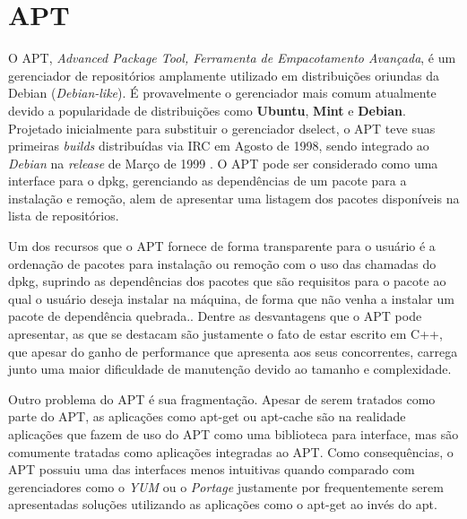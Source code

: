 \section{APT} %
\label{sec:apt}



O {\code APT}, \textit{Advanced Package Tool, Ferramenta de Empacotamento Avançada}, é um gerenciador de repositórios  amplamente utilizado em distribuições oriundas da Debian (\textit{Debian-like}).
É provavelmente o gerenciador mais comum atualmente devido a popularidade de distribuições como \textbf{Ubuntu}, \textbf{Mint} e \textbf{Debian}.
Projetado inicialmente para substituir o gerenciador {\code dselect}, o APT teve suas primeiras \textit{builds} distribuídas via IRC em Agosto de 1998,  sendo integrado ao \textit{Debian} na \textit{release} de Março de 1999 \cite{garbee2008brief}. O  APT pode ser considerado como uma interface para o {\code dpkg}, gerenciando as dependências de um pacote para a instalação e remoção, alem de apresentar uma listagem dos pacotes disponíveis na lista de repositórios. 

Um dos recursos que o APT fornece de forma transparente para o usuário é a ordenação de pacotes para instalação ou remoção com o uso das chamadas do {\code dpkg}, suprindo as dependências dos pacotes que são requisitos para o pacote ao qual o usuário deseja instalar na máquina, de forma que não venha a instalar um pacote de dependência quebrada.. Dentre as desvantagens que o APT pode apresentar, as que se destacam são justamente o fato de estar escrito em C++, que apesar do ganho de performance que apresenta aos seus concorrentes, carrega junto uma maior dificuldade de manutenção devido ao tamanho e complexidade. 

Outro problema do APT é sua fragmentação. Apesar de serem tratados como parte do APT, as aplicações como {\code apt-get} ou {\code apt-cache} são na realidade aplicações que fazem de uso do APT como uma biblioteca para interface, mas são comumente tratadas como aplicações integradas ao APT. Como consequências, o APT possuiu uma das interfaces menos intuitivas quando comparado com gerenciadores como o \textit{YUM} ou o \textit{Portage} justamente por frequentemente serem apresentadas soluções utilizando as aplicações como o {\code apt-get} ao invés do {\code apt}.

